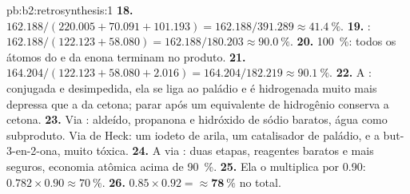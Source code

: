 \begin{solution}{pb:b2:retrosynthesis:1}
\textbf{18.} $162.188/(220.005 + 70.091 + 101.193) = 162.188/391.289 \approx 41.4~\%$.
\textbf{19.} : $162.188/(122.123 + 58.080) = 162.188/180.203
\approx 90.0~\%$.
\textbf{20.} 100~\%: todos os átomos do  e da enona terminam no produto.
\textbf{21.} $164.204/(122.123 + 58.080 + 2.016) = 164.204/182.219 \approx 90.1~\%$.
\textbf{22.} A : conjugada e desimpedida, ela se liga ao paládio e é hidrogenada muito mais
depressa que a  da cetona; parar após um equivalente de hidrogênio conserva a cetona.
\textbf{23.} Via : aldeído, propanona e hidróxido de sódio baratos, água como subproduto. Via
de Heck: um iodeto de arila, um catalisador de paládio, e a but-3-en-2-ona, muito tóxica.
\textbf{24.} A via : duas etapas, reagentes baratos e mais seguros, economia atômica acima de 90~\%.
\textbf{25.} Ela o multiplica por 0.90: $0.782 \times 0.90 \approx 70~\%$.
\textbf{26.} $0.85 \times 0.92 = \boldsymbol{\approx 78~\%}$ no total.
\end{solution}
